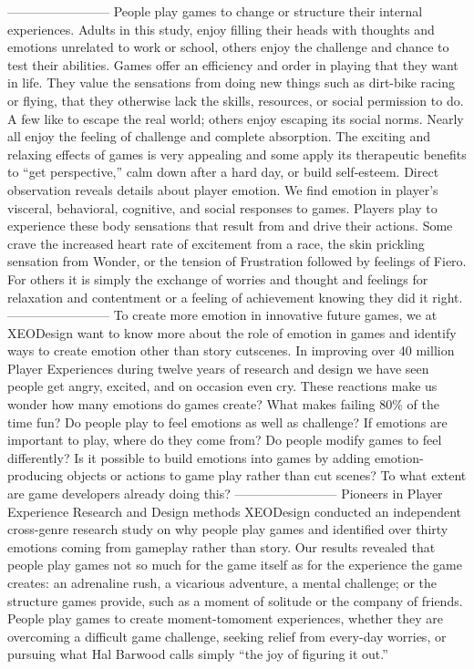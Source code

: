 ------------------------
People play games to change or structure their internal experiences. Adults in this study, enjoy filling their heads with thoughts and emotions unrelated to work or school, others enjoy the challenge and chance to test their abilities. Games offer an efficiency and order in playing that they want in life. They value the sensations from doing new things such as dirt-bike racing or flying, that they otherwise lack the skills, resources, or social permission to do. A few like to escape the real world; others enjoy escaping its social norms. Nearly all enjoy the feeling of challenge and complete absorption. The exciting and relaxing effects of games is very appealing and some apply its therapeutic benefits to ``get perspective,'' calm down after a hard day, or build self-esteem. Direct observation reveals details about player emotion. We find emotion in player's visceral, behavioral, cognitive, and social responses to games. Players play to experience these body sensations that result from and drive their actions. Some crave the increased heart rate of excitement from a race, the skin prickling sensation from Wonder, or the tension of Frustration followed by feelings of Fiero. For others it is simply the exchange of worries and thought and feelings for relaxation and contentment or a feeling of achievement knowing they did it right.
------------------------
To create more emotion in innovative future games, we at XEODesign want to know more about the role of emotion in games and identify ways to create emotion other than story cutscenes. In improving over 40 million Player Experiences during twelve years of research and design we have seen people get angry, excited, and on occasion even cry. These reactions make us wonder how many emotions do games create? What makes failing 80\% of the time fun? Do people play to feel emotions as well as challenge? If emotions are important to play, where do they come from? Do people modify games to feel differently? Is it possible to build emotions into games by adding emotion-producing objects or actions to game play rather than cut scenes? To what extent are game developers already doing this?
------------------------
Pioneers in Player Experience Research and Design methods XEODesign conducted an independent cross-genre research study on why people play games and identified over thirty emotions coming from gameplay rather than story. Our results revealed that people play games not so much for the game itself as for the experience the game creates: an adrenaline rush, a vicarious adventure, a mental challenge; or the structure games provide, such as a moment of solitude or the company of friends. People play games to create moment-tomoment experiences, whether they are overcoming a difficult game challenge, seeking relief from every-day worries, or pursuing what Hal Barwood calls simply ``the joy of figuring it out.''

